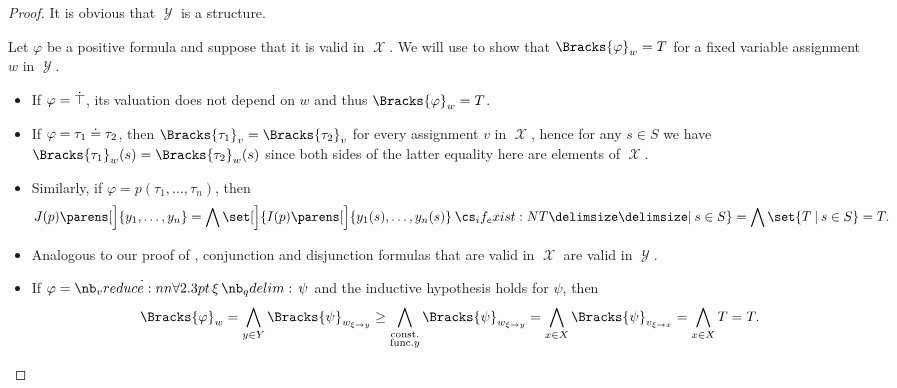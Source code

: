 \begin{proof}
  It is obvious that \( \mscrY \) is a structure.

  Let \( \varphi \) be a positive formula and suppose that it is valid in \( \mscrX \). We will use  to show that \( \Bracks{\varphi}_w = T \) for a fixed variable assignment \( w \) in \( \mscrY \).
  \begin{itemize}
    \item If \( \varphi = \dot\top \), its valuation does not depend on \( w \) and thus \( \Bracks{\varphi}_w = T \).

    \item If \( \varphi = \tau_1 \doteq \tau_2 \), then \( \Bracks{\tau_1}_v = \Bracks{\tau_2}_v \) for every assignment \( v \) in \( \mscrX \), hence for any \( s \in S \) we have \( \Bracks{\tau_1}_w(s) = \Bracks{\tau_2}_w(s) \) since both sides of the latter equality here are elements of \( \mscrX \).

    \item Similarly, if \( \varphi = p(\tau_1, \ldots, \tau_n) \), then
    \begin{equation*}
      J(p) \parens[\Big]{ y_1, \ldots, y_n }
      =
      \bigwedge \set[\Big]{ I(p) \parens[\Big]{ y_1(s), \ldots, y_n(s) } \given* s \in S }
      =
      \bigwedge \set{ T \given s \in S }
      =
      T.
    \end{equation*}

    \item Analogous to our proof of , conjunction and disjunction formulas that are valid in \( \mscrX \) are valid in \( \mscrY \).

    \item If \( \varphi = \qforall \xi \psi \) and the inductive hypothesis holds for \( \psi \), then
    \begin{equation*}
      \Bracks{\varphi}_w
      =
      \bigwedge_{y \in Y} \Bracks{\psi}_{w_{\xi \to y}}
      \geq
      \bigwedge_{\substack{\T{const.} \\ \T{func.} y}} \Bracks{\psi}_{w_{\xi \to y}}
      =
      \bigwedge_{x \in X} \Bracks{\psi}_{v_{\xi \to x}}
      =
      \bigwedge_{x \in X} T
      =
      T.
    \end{equation*}
  \end{itemize}
\end{proof}

